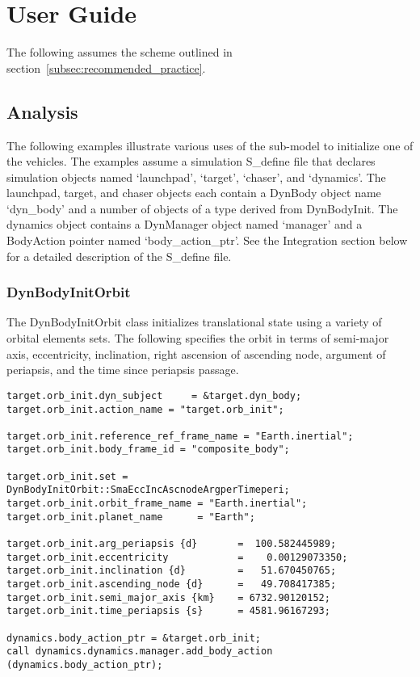 %

\chapter{User Guide}\label{ch:\modelpartid:user}
The following assumes the scheme outlined in
section~\ref{subsec:recommended_practice}.

\section{Analysis}

The following examples illustrate various uses of the sub-model to
initialize one of the vehicles. The examples assume
a simulation S\_define file that declares simulation objects
named `launchpad', `target', `chaser', and `dynamics'.
The launchpad, target, and chaser objects
each contain a DynBody object name `dyn\_body'
and a number of objects of a type derived from DynBodyInit.
The dynamics object contains a DynManager object named `manager'
and a BodyAction pointer named `body\_action\_ptr'.
See the Integration section below for a detailed description of the
S\_define file.

\subsection{DynBodyInitOrbit}
The DynBodyInitOrbit class initializes translational state
using a variety of orbital elements sets.
The following specifies the orbit in terms of
semi-major axis, eccentricity, inclination,
right ascension of ascending node, argument of periapsis, and the time
since periapsis passage.

\begin{verbatim}
target.orb_init.dyn_subject     = &target.dyn_body;
target.orb_init.action_name = "target.orb_init";

target.orb_init.reference_ref_frame_name = "Earth.inertial";
target.orb_init.body_frame_id = "composite_body";

target.orb_init.set = DynBodyInitOrbit::SmaEccIncAscnodeArgperTimeperi;
target.orb_init.orbit_frame_name = "Earth.inertial";
target.orb_init.planet_name      = "Earth";

target.orb_init.arg_periapsis {d}       =  100.582445989;
target.orb_init.eccentricity            =    0.00129073350;
target.orb_init.inclination {d}         =   51.670450765;
target.orb_init.ascending_node {d}      =   49.708417385;
target.orb_init.semi_major_axis {km}    = 6732.90120152;
target.orb_init.time_periapsis {s}      = 4581.96167293;

dynamics.body_action_ptr = &target.orb_init;
call dynamics.dynamics.manager.add_body_action (dynamics.body_action_ptr);
\end{verbatim}

